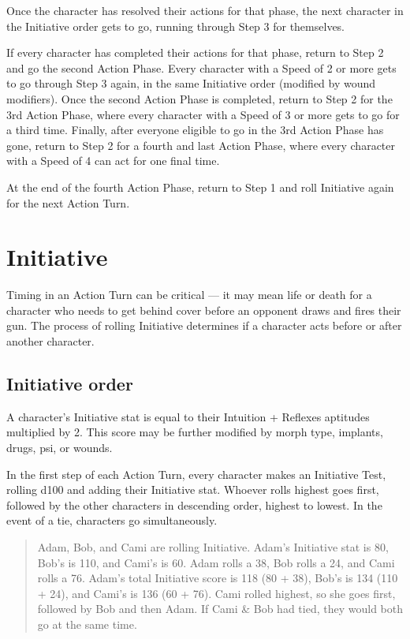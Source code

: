 Once the character has resolved their actions for that phase, the next character in the Initiative order gets to go, running through Step 3 for themselves.

If every character has completed their actions for that phase, return to Step 2 and go the second Action Phase. Every character with a Speed of 2 or more gets to go through Step 3 again, in the same Initiative order (modified by wound modifiers). Once the second Action Phase is completed, return to Step 2 for the 3rd Action Phase, where every character with a Speed of 3 or more gets to go for a third time. Finally, after everyone eligible to go in the 3rd Action Phase has gone, return to Step 2 for a fourth and last Action Phase, where every character with a Speed of 4 can act for one final time.

At the end of the fourth Action Phase, return to Step 1 and roll Initiative again for the next Action Turn.


\section{Initiative}
\label{sec:initiative}

Timing in an Action Turn can be critical --- it may mean life or death for a character who needs to get behind cover before an opponent draws and fires their gun. The process of rolling Initiative determines if a character acts before or after another character.


\subsection{Initiative order}
\label{sec:initiative-order}

A character’s Initiative stat is equal to their Intuition + Reflexes aptitudes multiplied by 2. This score may be further modified by morph type, implants, drugs, psi, or wounds.

In the first step of each Action Turn, every character makes an Initiative Test, rolling d100 and adding their Initiative stat. Whoever rolls highest goes first, followed by the other characters in descending order, highest to lowest. In the event of a tie, characters go simultaneously.

\begin{quotation}
Adam, Bob, and Cami are rolling Initiative. Adam’s Initiative stat is 80, Bob’s is 110, and Cami’s is 60. Adam rolls a 38, Bob rolls a 24, and Cami rolls a 76. Adam’s total Initiative score is 118 (80 + 38), Bob’s is 134 (110 + 24), and Cami’s is 136 (60 + 76). Cami rolled highest, so she goes first, followed by Bob and then Adam. If Cami \& Bob had tied, they would both go at the same time.
\end{quotation}

